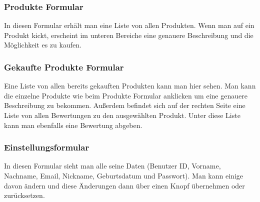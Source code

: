 \subsubsection{Produkte Formular}
In diesen Formular erhält man eine Liste von allen Produkten. Wenn man auf ein Produkt kickt, erscheint im unteren Bereiche eine genauere Beschreibung und die Möglichkeit es zu kaufen.

\subsubsection{Gekaufte Produkte Formular}
Eine Liste von allen bereits gekauften Produkten kann man hier sehen. Man kann die einzelne Produkte wie beim Produkte Formular anklicken um eine genauere Beschreibung zu bekommen. Außerdem befindet sich auf der rechten Seite eine Liste von allen Bewertungen zu den ausgewählten Produkt. Unter diese Liste kann man ebenfalls eine Bewertung abgeben.

\subsubsection{Einstellungsformular}
In diesen Formular sieht man alle seine Daten (Benutzer ID, Vorname, Nachname, Email, Nickname, Geburtsdatum und Passwort). Man kann einige davon ändern und diese Änderungen dann über einen Knopf übernehmen oder zurücksetzen.